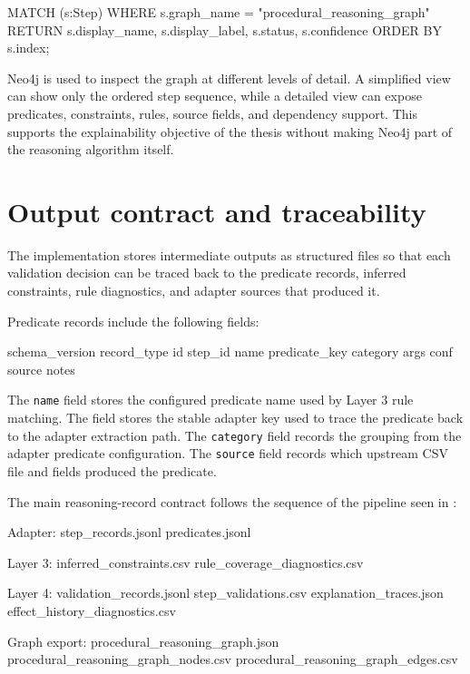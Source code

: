\begin{Code}
MATCH (s:Step)
WHERE s.graph_name = "procedural_reasoning_graph"
RETURN s.display_name, s.display_label, s.status, s.confidence
ORDER BY s.index;
\end{Code}

Neo4j is used to inspect the graph at different levels of detail. A simplified view can show only the ordered step sequence, while a detailed view can expose predicates, constraints, rules, source fields, and dependency support. This supports the explainability objective of the thesis without making Neo4j part of the reasoning algorithm itself.

\section{Output contract and traceability}
\label{sec:implementation-output-contract}

The implementation stores intermediate outputs as structured files so that each validation decision can be traced back to the predicate records, inferred constraints, rule diagnostics, and adapter sources that produced it.

Predicate records include the following fields:

\begin{Code}
    schema_version
    record_type
    id
    step_id
    name
    predicate_key
    category
    args
    conf
    source
    notes
\end{Code}

The \texttt{name} field stores the configured predicate name used by Layer 3 rule matching. The  field stores the stable adapter key used to trace the predicate back to the adapter extraction path. The \texttt{category} field records the grouping from the adapter predicate configuration. The \texttt{source} field records which upstream CSV file and fields produced the predicate.

The main reasoning-record contract follows the sequence of the pipeline seen in :

\begin{Code}
Adapter:
  step_records.jsonl
  predicates.jsonl

Layer 3:
  inferred_constraints.csv
  rule_coverage_diagnostics.csv

Layer 4:
  validation_records.jsonl
  step_validations.csv
  explanation_traces.json
  effect_history_diagnostics.csv

Graph export:
  procedural_reasoning_graph.json
  procedural_reasoning_graph_nodes.csv
  procedural_reasoning_graph_edges.csv
\end{Code}

